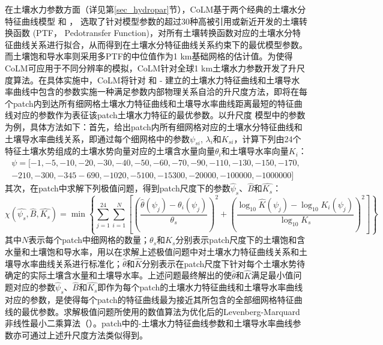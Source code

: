 在土壤水力参数方面（详见第\ref{sec_hydropar}节），CoLM基于两个经典的土壤水分特征曲线模型 \citet{campbell1974} 和 \citet{van1980closed}，
选取了针对模型参数的超过30种高被引用或新近开发的土壤转换函数 (PTF， Pedotransfer Function)，对所有土壤转换函数对应的土壤水分特征曲线关系进行拟合，从而得到在土壤水分特征曲线关系约束下的最优模型参数。而土壤饱和导水率则采用多PTF的中位值作为1 km基础网格的估计值。为使得CoLM可应用于不同分辨率的模拟，CoLM针对全球1 km土壤水力参数开发了升尺度算法。在具体实施中，CoLM将针对 \citet{campbell1974} 和 \citet{van1980closed}-\citet{mualem1976new} 建立的土壤水力特征曲线和土壤导水率曲线中包含的参数实施一种满足参数内部物理关系自洽的升尺度方法，即将在每个patch内到达所有细网格土壤水力特征曲线和土壤导水率曲线距离最短的特征曲线对应的参数作为表征该patch土壤水力特征的最优参数。以升尺度 \citet{campbell1974} 模型中的参数为例，具体方法如下：首先，给出patch内所有细网格对应的土壤水分特征曲线和土壤导水率曲线关系，即通过每个细网格中的参数$\psi_{s i}$, $\lambda_{i}$和$K_{si}$，计算下列由24个特征土壤水势组成的土壤水势向量对应的土壤含水量向量$\theta_i$和土壤导水率向量$K_i$：
\begin{equation}
\begin{array}{l}\psi=[-1,-5,-10,-20,-30,-40,-50,-60,-70,-90,-110,-130,-150,-170,\\-210,-300,-345  -690,-1020,-5100,-15300,-20000,-100000,-1000000]\end{array}
\end{equation}
其次，在patch中求解下列极值问题，得到patch尺度下的参数$\hat{\psi} _{s}$、$\hat{B}$和$\hat{K_s}$：
\begin{equation}
\chi\left(\hat{\psi_s}, \hat{B}, \hat{K_s}\right)=\min\left\{ \sum_{j=1}^{24}\sum_{i=1}^{N}\left[\left(\frac{\hat{\theta}\left(\psi_j\right)-\theta_i\left(\psi_j\right)}{\theta_s}\right)^2
+\left(\frac{\log_{10}\hat{K}\left(\psi_j\right)-\log_{10}K_i\left(\psi_j\right)}{\log_{10}K_s}\right)^2\right]\right\}
\end{equation}
其中$N$表示每个patch中细网格的数量；$\theta_s$和$K_s$分别表示patch尺度下的土壤饱和含水量和土壤饱和导水率，用以在求解上述极值问题中对土壤水力特征曲线关系和土壤导水率曲线关系进行标准化；$\hat{\theta}$和$\hat{K}$分别表示在patch尺度下针对每个土壤水势待确定的实际土壤含水量和土壤导水率。上述问题最终解出的使$\hat{\theta}$和$\hat{K}$满足最小值问题对应的参数$\hat{\psi}_{s}$、$\hat{B}$和$\hat{K_s}$即作为每个patch的土壤水力特征曲线和土壤导水率曲线对应的参数，是使得每个patch的特征曲线最为接近其所包含的全部细网格特征曲线的最优参数。求解极值问题所使用的数值算法为优化后的Levenberg-Marquard非线性最小二乘算法（\citet{Montzka2017scale}）。patch中的\citet{van1980closed}-\citet{mualem1976new}土壤水力特征曲线参数和土壤导水率曲线参数亦可通过上述升尺度方法类似得到。

